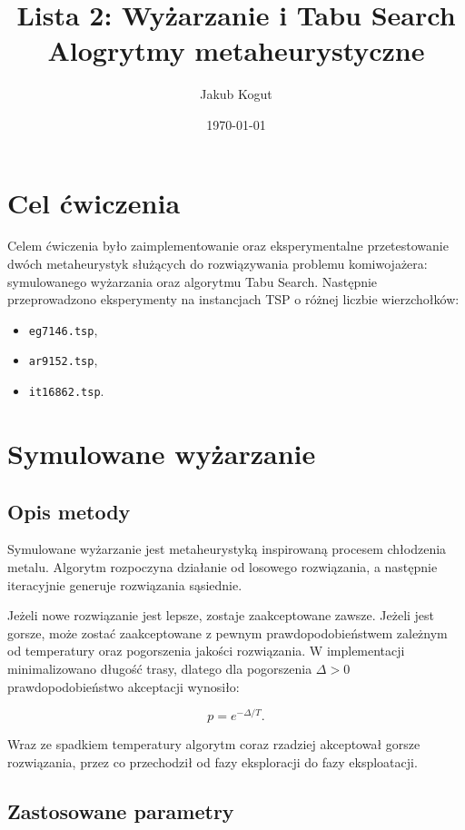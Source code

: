 \documentclass[12pt,a4paper]{article}
\title{Lista 2: Wyżarzanie i Tabu Search Alogrytmy metaheurystyczne}
\author{Jakub Kogut}
\date{\today}
\begin{document}
\maketitle

\section{Cel ćwiczenia}

Celem ćwiczenia było zaimplementowanie oraz eksperymentalne przetestowanie dwóch metaheurystyk służących do rozwiązywania problemu komiwojażera: symulowanego wyżarzania oraz algorytmu Tabu Search. Następnie przeprowadzono eksperymenty na instancjach TSP o różnej liczbie wierzchołków:

\begin{itemize}
    \item \texttt{eg7146.tsp},
    \item \texttt{ar9152.tsp},
    \item \texttt{it16862.tsp}.
\end{itemize}

\section{Symulowane wyżarzanie}

\subsection{Opis metody}

Symulowane wyżarzanie jest metaheurystyką inspirowaną procesem chłodzenia metalu. Algorytm rozpoczyna działanie od losowego rozwiązania, a następnie iteracyjnie generuje rozwiązania sąsiednie.

Jeżeli nowe rozwiązanie jest lepsze, zostaje zaakceptowane zawsze. Jeżeli jest gorsze, może zostać zaakceptowane z pewnym prawdopodobieństwem zależnym od temperatury oraz pogorszenia jakości rozwiązania. W implementacji minimalizowano długość trasy, dlatego dla pogorszenia $\Delta > 0$ prawdopodobieństwo akceptacji wynosiło:

\[
p = e^{-\Delta/T}.
\]

Wraz ze spadkiem temperatury algorytm coraz rzadziej akceptował gorsze rozwiązania, przez co przechodził od fazy eksploracji do fazy eksploatacji.

\subsection{Zastosowane parametry}
\end{document}
